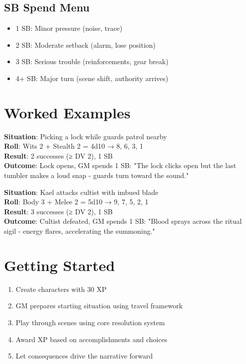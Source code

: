 \documentclass[11pt]{article}
\begin{document}
\subsection{SB Spend Menu}
\begin{itemize}
    \item 1 SB: Minor pressure (noise, trace)
    \item 2 SB: Moderate setback (alarm, lose position)
    \item 3 SB: Serious trouble (reinforcements, gear break)
    \item 4+ SB: Major turn (scene shift, authority arrives)
\end{itemize}

\section{Worked Examples}

\begin{examplebox}
\textbf{Situation}: Picking a lock while guards patrol nearby\\
\textbf{Roll}: Wits 2 + Stealth 2 = 4d10 → {8, 6, 3, 1}\\
\textbf{Result}: 2 successes (≥ DV 2), 1 SB\\
\textbf{Outcome}: Lock opens, GM spends 1 SB: "The lock clicks open but the last tumbler makes a loud snap - guards turn toward the sound."
\end{examplebox}

\begin{examplebox}
\textbf{Situation}: Kael attacks cultist with imbued blade\\
\textbf{Roll}: Body 3 + Melee 2 = 5d10 → {9, 7, 5, 2, 1}\\
\textbf{Result}: 3 successes (≥ DV 2), 1 SB\\
\textbf{Outcome}: Cultist defeated, GM spends 1 SB: "Blood sprays across the ritual sigil - energy flares, accelerating the summoning."
\end{examplebox}

\section{Getting Started}

\begin{enumerate}
    \item Create characters with 30 XP
    \item GM prepares starting situation using travel framework
    \item Play through scenes using core resolution system
    \item Award XP based on accomplishments and choices
    \item Let consequences drive the narrative forward
\end{enumerate}
\end{document}
